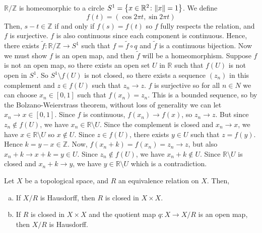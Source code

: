 \begin{example}
	\( \mathbb R / \mathbb Z \) is homeomorphic to a circle \( S^1 = \qty{x \in \mathbb R^2 \colon \norm{x} = 1} \).
	We define
	\[
		f(t) = (\cos 2 \pi t, \sin 2 \pi t)
	\]
	Then, \( s - t \in \mathbb Z \) if and only if \( f(s) = f(t) \) so \( f \) fully respects the relation, and \( f \) is surjective.
	\( f \) is also continuous since each component is continuous.
	Hence, there exists \( \widetilde f \colon \mathbb R / \mathbb Z \to S^1 \) such that \( f = \widetilde f \circ q \) and \( \widetilde f \) is a continuous bijection.
	Now we must show \( f \) is an open map, and then \( \widetilde f \) will be a homeomorphism.
	Suppose \( f \) is not an open map, so there exists an open set \( U \) in \( \mathbb R \) such that \( f(U) \) is not open in \( S^1 \).
	So \( S^1 \setminus f(U) \) is not closed, so there exists a sequence \( (z_n) \) in this complement and \( z \in f(U) \) such that \( z_n \to z \).
	\( f \) is surjective so for all \( n \in N \) we can choose \( x_n \in [0,1] \) such that \( f(x_n) = z_n \).
	This is a bounded sequence, so by the Bolzano-Weierstrass theorem, without loss of generality we can let \( x_n \to x \in [0,1] \).
	Since \( f \) is continuous, \( f(x_n) \to f(x) \), so \( z_n \to z \).
	But since \( z_n \not\in f(U) \), we have \( x_n \in \mathbb R \setminus U \).
	Since the complement is closed and \( x_n \to x \), we have \( x \in \mathbb R \setminus U \) so \( x \not\in U \).
	Since \( z \in f(U) \), there exists \( y \in U \) such that \( z = f(y) \).
	Hence \( k = y - x \in \mathbb Z \).
	Now, \( f(x_n + k) = f(x_n) = z_n \to z \), but also \( x_n + k \to x + k = y \in U \).
	Since \( z_n \not\in f(U) \), we have \( x_n + k \not\in U \).
	Since \( \mathbb R \setminus U \) is closed and \( x_n + k \to y \), we have \( y \in \mathbb R \setminus U \) which is a contradiction.
\end{example}
\begin{proposition}
	Let \( X \) be a topological space, and \( R \) an equivalence relation on \( X \).
	Then,
	\begin{enumerate}[(a)]
		\item If \( X / R \) is Hausdorff, then \( R \) is closed in \( X \times X \).
		\item If \( R \) is closed in \( X \times X \) and the quotient map \( q \colon X \to X/R \) is an open map, then \( X / R \) is Hausdorff.
	\end{enumerate}
\end{proposition}
